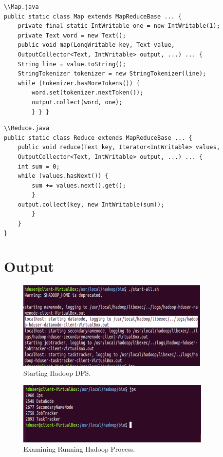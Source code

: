 \documentclass[a4paper,10pt]{article}
\begin{document}
\begin{lstlisting}
\\Map.java
public static class Map extends MapReduceBase ... {
	private final static IntWritable one = new IntWritable(1);
	private Text word = new Text();
	public void map(LongWritable key, Text value,
	OutputCollector<Text, IntWritable> output, ...) ... {
	String line = value.toString();
	StringTokenizer tokenizer = new StringTokenizer(line);
	while (tokenizer.hasMoreTokens()) {
		word.set(tokenizer.nextToken());
		output.collect(word, one);
		} } }
\end{lstlisting}
\begin{lstlisting}
\\Reduce.java
public static class Reduce extends MapReduceBase ... {
	public void reduce(Text key, Iterator<IntWritable> values,
	OutputCollector<Text, IntWritable> output, ...) ... {
	int sum = 0;
	while (values.hasNext()) {
		sum += values.next().get();
		}
	output.collect(key, new IntWritable(sum));
		}
	}
}
\end{lstlisting}
\section{Output}
\begin{figure}[h]
	\includegraphics[scale=0.55,center]{exptTwoScreenShot/fig1.png}
	\caption{Starting Hadoop DFS.}
	\label{fig:1}
	
\end{figure}
\begin{figure}[h]
	\includegraphics[scale=0.54,center]{exptTwoScreenShot/fig2.png}
	\caption{Examining Running Hadoop Process.}
	\label{fig:2}
\end{figure}
\end{document}
